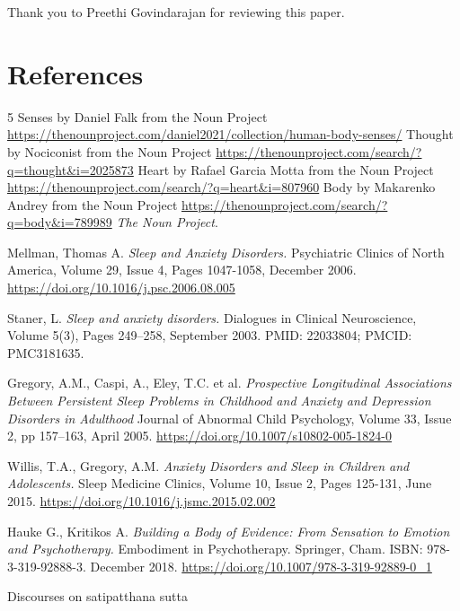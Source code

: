 \documentclass[a4paper, amsfonts, amssymb, amsmath, reprint, showkeys, nofootinbib, twoside]{revtex4-1}
\begin{document}
Thank you to Preethi Govindarajan for reviewing this paper.


\section*{References}

\begin{thebibliography}{99}

  5 Senses by Daniel Falk from the Noun Project
  \url{https://thenounproject.com/daniel2021/collection/human-body-senses/}
  Thought by Nociconist from the Noun Project
  \url{https://thenounproject.com/search/?q=thought&i=2025873}
  Heart by Rafael Garcia Motta from the Noun Project
  \url{https://thenounproject.com/search/?q=heart&i=807960}
  Body by Makarenko Andrey from the Noun Project
  \url{https://thenounproject.com/search/?q=body&i=789989}
  \textit{The Noun Project}.

  Mellman, Thomas A.
  \textit{Sleep and Anxiety Disorders.}
  Psychiatric Clinics of North America, Volume 29, Issue 4, Pages 1047-1058, December 2006.
  \url{https://doi.org/10.1016/j.psc.2006.08.005}

  Staner, L.
  \textit{Sleep and anxiety disorders.}
  Dialogues in Clinical Neuroscience, Volume 5(3), Pages 249–258, September 2003.
  PMID: 22033804; PMCID: PMC3181635.

  Gregory, A.M., Caspi, A., Eley, T.C. et al.
  \textit{Prospective Longitudinal Associations Between Persistent Sleep Problems in
    Childhood and Anxiety and Depression Disorders in Adulthood}
  Journal of Abnormal Child Psychology, Volume 33, Issue 2, pp 157–163, April 2005.
  \url{https://doi.org/10.1007/s10802-005-1824-0}

  Willis, T.A., Gregory, A.M.
  \textit{Anxiety Disorders and Sleep in Children and Adolescents.}
  Sleep Medicine Clinics, Volume 10, Issue 2, Pages 125-131, June 2015.
  \url{https://doi.org/10.1016/j.jsmc.2015.02.002}

  Hauke G., Kritikos A.
  \textit{Building a Body of Evidence: From Sensation to Emotion and Psychotherapy.}
  Embodiment in Psychotherapy. Springer, Cham.
  ISBN: 978-3-319-92888-3. December 2018.
  \url{https://doi.org/10.1007/978-3-319-92889-0_1}

  Discourses on satipatthana sutta


\end{thebibliography}
\end{document}
